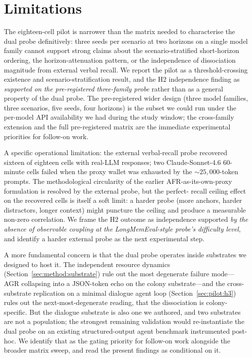 \section{Limitations}
\label{sec:limitations}

The eighteen-cell pilot is narrower than the matrix needed to
characterise the dual probe definitively: three seeds per
scenario at two horizons on a single model family cannot support
strong claims about the scenario-stratified short-horizon
ordering, the horizon-attenuation pattern, or the independence of
dissociation magnitude from external verbal recall. We report the
pilot as a threshold-crossing existence and scenario-stratification
result, and the H2 independence finding as \emph{supported on the
pre-registered three-family probe} rather than as a general
property of the dual probe. The pre-registered wider design
(three model families, three scenarios, five seeds, four
horizons) is the subset we could run under the per-model API
availability we had during the study window; the cross-family
extension and the full pre-registered matrix are the immediate
experimental priorities for follow-on work.

A specific operational limitation: the external verbal-recall
probe recovered sixteen of eighteen cells with real-LLM responses;
two Claude-Sonnet-4.6 60-minute cells failed when the proxy
wallet was exhausted by the ${\sim}25{,}000$-token prompts. The
methodological circularity of the earlier AFR-as-its-own-proxy
formulation is resolved by the external probe, but the perfect-
recall ceiling effect on the recovered cells is itself a soft
limit: a harder probe (more anchors, harder distractors, longer
context) might puncture the ceiling and produce a measurable
non-zero correlation. We frame the H2 outcome as independence
supported \emph{by the absence of observable coupling at the
LongMemEval-style probe's difficulty level}, and identify a
harder external probe as the next experimental step.

A more fundamental concern is that the dual probe operates inside
substrates we designed to host it. The independent resource
dynamics (Section~\ref{sec:method:substrate}) rule out the most
degenerate failure mode---AGR collapsing into a JSON-token echo
on the colony substrate---and the cross-substrate replication on
a minimal dialogue agent loop (Section~\ref{sec:pilot:h3}) rules
out the next-most-degenerate reading, that the dissociation is
colony-specific. But the dialogue substrate is also one we
authored, and two substrates are not a population; the strongest
remaining validation would re-instantiate the dual probe on an
existing structured-output agent benchmark instrumented post-hoc.
We identify that as the gating priority for follow-on work
alongside the broader matrix sweep, and read the present findings
as conditional on it.
